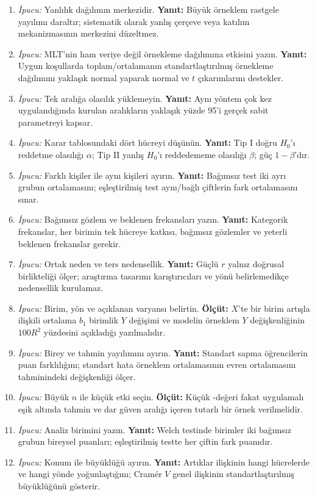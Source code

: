 \begin{enumerate}[leftmargin=*,itemsep=5pt]
\item \emph{İpucu:} Yanlılık dağılımın merkezidir.
\textbf{Yanıt:} Büyük örneklem rastgele yayılımı daraltır; sistematik olarak
yanlış çerçeve veya katılım mekanizmasının merkezini düzeltmez.
\item \emph{İpucu:} MLT'nin ham veriye değil örnekleme dağılımına etkisini yazın.
\textbf{Yanıt:} Uygun koşullarda toplam/ortalamanın standartlaştırılmış
örnekleme dağılımını yaklaşık normal yaparak normal ve $t$ çıkarımlarını destekler.
\item \emph{İpucu:} Tek aralığa olasılık yüklemeyin.
\textbf{Yanıt:} Aynı yöntem çok kez uygulandığında kurulan aralıkların yaklaşık
yüzde 95'i gerçek sabit parametreyi kapsar.
\item \emph{İpucu:} Karar tablosundaki dört hücreyi düşünün.
\textbf{Yanıt:} Tip I doğru $H_0$'ı reddetme olasılığı $\alpha$; Tip II yanlış
$H_0$'ı reddedememe olasılığı $\beta$; güç $1-\beta$'dır.
\item \emph{İpucu:} Farklı kişiler ile aynı kişileri ayırın.
\textbf{Yanıt:} Bağımsız test iki ayrı grubun ortalamasını; eşleştirilmiş test
aynı/bağlı çiftlerin fark ortalamasını sınar.
\item \emph{İpucu:} Bağımsız gözlem ve beklenen frekansları yazın.
\textbf{Yanıt:} Kategorik frekanslar, her birimin tek hücreye katkısı,
bağımsız gözlemler ve yeterli beklenen frekanslar gerekir.
\item \emph{İpucu:} Ortak neden ve ters nedensellik.
\textbf{Yanıt:} Güçlü $r$ yalnız doğrusal birlikteliği ölçer; araştırma tasarımı
karıştırıcıları ve yönü belirlemedikçe nedensellik kurulamaz.
\item \emph{İpucu:} Birim, yön ve açıklanan varyansı belirtin.
\textbf{Ölçüt:} $X$'te bir birim artışla ilişkili ortalama $b_1$ birimlik $Y$
değişimi ve modelin örneklem $Y$ değişkenliğinin $100R^2$ yüzdesini açıkladığı yazılmalıdır.
\item \emph{İpucu:} Birey ve tahmin yayılımını ayırın.
\textbf{Yanıt:} Standart sapma öğrencilerin puan farklılığını; standart hata
örneklem ortalamasının evren ortalamasını tahminindeki değişkenliği ölçer.
\item \emph{İpucu:} Büyük $n$ ile küçük etki seçin.
\textbf{Ölçüt:} Küçük \pval-değeri fakat uygulamalı eşik altında tahmin ve dar güven
aralığı içeren tutarlı bir örnek verilmelidir.
\item \emph{İpucu:} Analiz birimini yazın.
\textbf{Yanıt:} Welch testinde birimler iki bağımsız grubun bireysel puanları;
eşleştirilmiş testte her çiftin fark puanıdır.
\item \emph{İpucu:} Konum ile büyüklüğü ayırın.
\textbf{Yanıt:} Artıklar ilişkinin hangi hücrelerde ve hangi yönde yoğunlaştığını;
Cramér $V$ genel ilişkinin standartlaştırılmış büyüklüğünü gösterir.
\end{enumerate}

